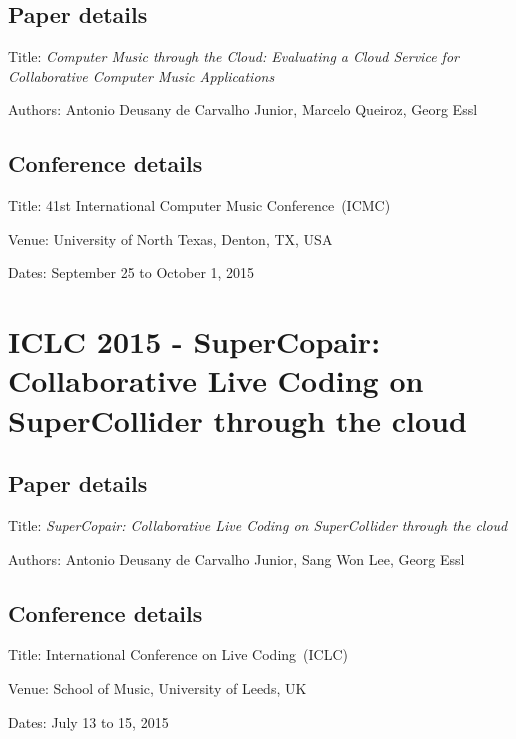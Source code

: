 \subsection*{Paper details}

Title: \textit{Computer Music through the Cloud: Evaluating a Cloud Service for Collaborative Computer Music Applications}

Authors: Antonio Deusany de Carvalho Junior, Marcelo Queiroz, Georg Essl

\subsection*{Conference details}

Title: 41st International Computer Music Conference~(ICMC)

Venue: University of North Texas, Denton, TX, USA

Dates: September 25 to October 1, 2015



\section{ICLC 2015 - SuperCopair: Collaborative Live Coding on SuperCollider through the cloud}
\label{ape:papericlc2015}

\subsection*{Paper details}

Title: \textit{SuperCopair: Collaborative Live Coding on SuperCollider through the cloud}

Authors: Antonio Deusany de Carvalho Junior, Sang Won Lee, Georg Essl

\subsection*{Conference details}

Title: International Conference on Live Coding~(ICLC)

Venue: School of Music, University of Leeds, UK

Dates: July 13 to 15, 2015



